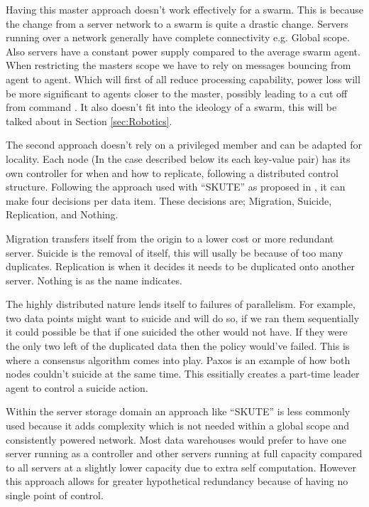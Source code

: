 \documentclass{UoYCSproject}
\begin{document}
Having this master approach doesn’t work effectively for a swarm.
This is because the change from a server network to a swarm is quite a drastic change.
Servers running over a network generally have complete connectivity e.g. Global scope.
Also servers have a constant power supply compared to the average swarm agent.
When restricting the masters scope we have to rely on messages bouncing from agent to agent. 
Which will first of all reduce processing capability, power loss will be more significant to agents closer to the master, possibly leading to a cut off from command \cite{Swarm robotics reviewed}.
It also doesn’t fit into the ideology of a swarm, this will be talked about in Section \ref{sec:Robotics}.

The second approach doesn’t rely on a privileged member and can be adapted for locality.
Each node (In the case described below its each key-value pair) has its own controller for when and how to replicate, following a distributed control structure.
Following the approach used with “SKUTE” as proposed in \cite{Distributed Storage}, it can make four decisions per data item.
These decisions are; Migration, Suicide, Replication, and Nothing.

Migration transfers itself from the origin to a lower cost or more redundant server.
Suicide is the removal of itself, this will usally be because of too many duplicates.
Replication is when it decides it needs to be duplicated onto another server.
Nothing is as the name indicates.

The highly distributed nature lends itself to failures of parallelism. 
For example, two data points might want to suicide and will do so, if we ran them sequentially it could possible be that if one suicided the other would not have. 
If they were the only two left of the duplicated data then the policy would’ve failed.
This is where a consensus algorithm comes into play.
Paxos \cite{Paxos} is an example of how both nodes couldn’t suicide at the same time. 
This essitially creates a part-time leader agent to control a suicide action.

Within the server storage  domain an approach like “SKUTE” is less commonly used because it adds complexity which is not needed within a global scope and consistently powered network.
Most data warehouses would prefer to have one server running as a controller and other servers running at full capacity compared to all servers at a slightly lower capacity due to extra self computation.
However this approach allows for greater hypothetical redundancy because of having no single point of control.
\end{document}
